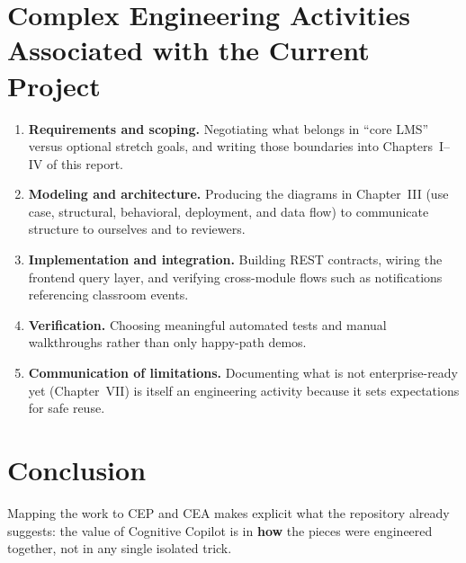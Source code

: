 \section{Complex Engineering Activities Associated with the Current Project}
\begin{enumerate}[label=\arabic*.]
\item \textbf{Requirements and scoping.} Negotiating what belongs in ``core LMS'' versus optional stretch goals, and writing those boundaries into Chapters~I--IV of this report.

\item \textbf{Modeling and architecture.} Producing the diagrams in Chapter~III (use case, structural, behavioral, deployment, and data flow) to communicate structure to ourselves and to reviewers.

\item \textbf{Implementation and integration.} Building REST contracts, wiring the frontend query layer, and verifying cross-module flows such as notifications referencing classroom events.

\item \textbf{Verification.} Choosing meaningful automated tests and manual walkthroughs rather than only happy-path demos.

\item \textbf{Communication of limitations.} Documenting what is not enterprise-ready yet (Chapter~VII) is itself an engineering activity because it sets expectations for safe reuse.
\end{enumerate}

\section{Conclusion}
Mapping the work to CEP and CEA makes explicit what the repository already suggests: the value of Cognitive Copilot is in \textbf{how} the pieces were engineered together, not in any single isolated trick.
